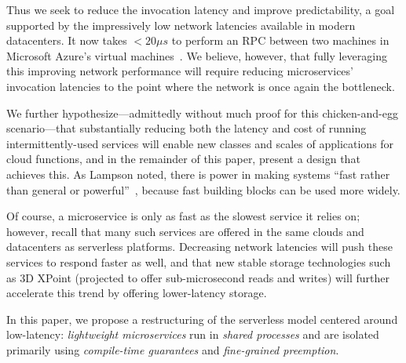 Thus we seek to reduce the invocation latency and improve predictability, a
goal supported by the impressively low network latencies available in modern
datacenters. It now takes $<20\mu{}s$ to perform an RPC between two machines in
Microsoft Azure's virtual machines~\cite{Firestone:nsdi2018}. We believe,
however, that fully leveraging this improving network performance will require
reducing microservices' invocation latencies to the point where the network is
once again the bottleneck.

We further hypothesize---admittedly without much proof for this chicken-and-egg
scenario---that substantially reducing both the latency and cost of running
intermittently-used services will enable new classes and scales of applications
for cloud functions, and in the remainder of this paper, present a design that
achieves this.  As Lampson noted, there is power in making systems 
``fast rather than general or powerful''~\cite{Lampson1983}, because fast
building blocks can be used more widely.

Of course, a microservice is only as fast as the slowest service it relies on;
however, recall that many such services are offered in the same clouds and
datacenters as serverless platforms. Decreasing network latencies will push
these services to respond faster as well, and that new stable storage
technologies such as 3D XPoint (projected to offer sub-microsecond reads and
writes) will further accelerate this trend by offering lower-latency storage.

In this paper, we propose a restructuring of the serverless model centered around
low-latency: \textit{lightweight microservices} run in \textit{shared processes}
and are isolated primarily using \textit{compile-time guarantees} and
\textit{fine-grained preemption}.



